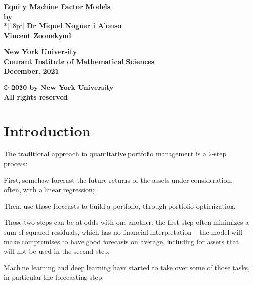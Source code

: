 \documentclass[12pt]{article}
\begin{document}
\begin{center}
\vspace*{.25in}
{\bf\LARGE  { Equity Machine Factor Models }}\\ %
\vspace*{.75in}
{\bf by} \\*[18pt]
\vspace*{.2in}
{\bf Dr Miquel Noguer i Alonso} \\
{\bf Vincent Zoonekynd} \\
\vspace*{1in}

{\bf New York University} \\
{\bf Courant Institute of Mathematical Sciences }\\
{\bf December, 2021} \\     %
\vspace*{.5in}
\begin{small}
{\bf \copyright{ }2020 by New York University} \\ %
{\bf All rights reserved}
\end{small}
\end{center}
\newpage 
\newtheorem{definition}{Definition}[section]
\clearpage

\section{Introduction}

The traditional approach to quantitative portfolio management is a 2-step process:
\begin{compactitem}[--]
\item First, somehow forecast the future returns of the assets under consideration, 
  often, with a linear regression;
\item Then, use those forecasts to build a portfolio, through portfolio optimization.
\end{compactitem}

Those two steps can be at odds with one another: the first step often minimizes a sum of squared residuals,
which has no financial interpretation -- the model will make compromises to have good forecasts on average,
including for assets that will not be used in the second step.

Machine learning and deep learning have started to take over some of those tasks, in particular the forecasting step.
\end{document}
